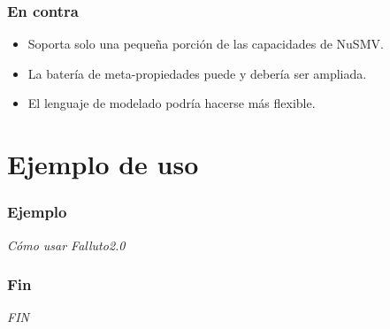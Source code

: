 \documentclass[serif]{beamer}
\begin{document}
\begin{frame}
\frametitle{En contra}
\begin{itemize}

\item Soporta solo una pequeña porción de las capacidades de NuSMV.

\item La batería de meta-propiedades puede y debería ser ampliada.

\item El lenguaje de modelado podría hacerse más flexible.

\end{itemize}
\end{frame}


\section[Ejemplo]{Ejemplo de uso}
\begin{frame}
\frametitle{Ejemplo}
\begin{center}{\LARGE \emph{Cómo usar Falluto2.0}}\end{center}
\end{frame}




\begin{frame}
\frametitle{Fin}
\begin{center}{\LARGE \emph{FIN}}\end{center}
\end{frame}


\end{document}
